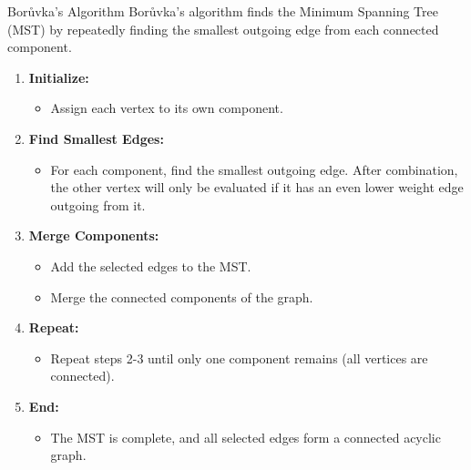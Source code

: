 \begin{usage}[]{Borůvka's Algorithm}
    Borůvka's algorithm finds the Minimum Spanning Tree (MST) by repeatedly finding the smallest outgoing edge from each connected component.

    \begin{enumerate}
        \item \textbf{Initialize:}
              \begin{itemize}
                  \item Assign each vertex to its own component.
              \end{itemize}

        \item \textbf{Find Smallest Edges:}
              \begin{itemize}
                  \item For each component, find the smallest outgoing edge. After combination, the other vertex will only be evaluated if it has an even lower weight edge outgoing from it.
              \end{itemize}

        \item \textbf{Merge Components:}
              \begin{itemize}
                  \item Add the selected edges to the MST.
                  \item Merge the connected components of the graph.
              \end{itemize}

        \item \textbf{Repeat:}
              \begin{itemize}
                  \item Repeat steps 2-3 until only one component remains (all vertices are connected).
              \end{itemize}

        \item \textbf{End:}
              \begin{itemize}
                  \item The MST is complete, and all selected edges form a connected acyclic graph.
              \end{itemize}
    \end{enumerate}
\end{usage}



